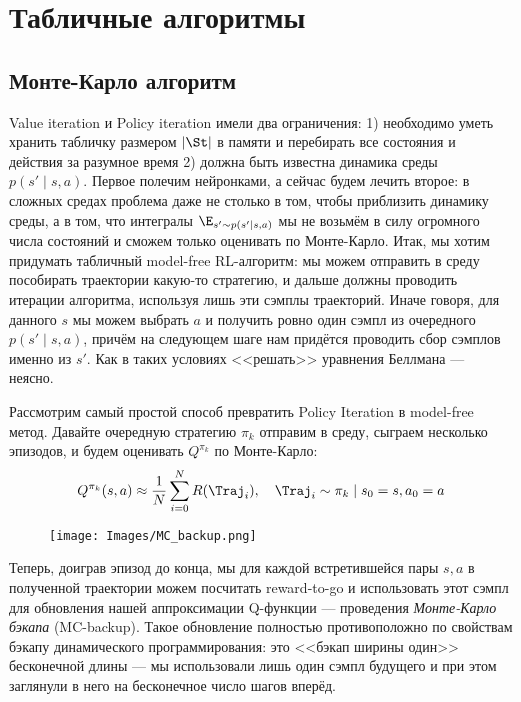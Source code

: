 \section{Табличные алгоритмы}\label{sec:tabularrlsection}

\subsection{Монте-Карло алгоритм}

Value iteration и Policy iteration имели два ограничения: 1) необходимо уметь хранить табличку размером $| \St |$ в памяти и перебирать все состояния и действия за разумное время 2) должна быть известна динамика среды $p(s' \mid s, a)$. Первое полечим нейронками, а сейчас будем лечить второе: в сложных средах проблема даже не столько в том, чтобы приблизить динамику среды, а в том, что интегралы $\E_{s' \sim p(s' \mid s, a)}$ мы не возьмём в силу огромного числа состояний и сможем только оценивать по Монте-Карло. 
Итак, мы хотим придумать табличный model-free RL-алгоритм: мы можем отправить в среду пособирать траектории какую-то стратегию, и дальше должны проводить итерации алгоритма, используя лишь эти сэмплы траекторий. Иначе говоря, для данного $s$ мы можем выбрать $a$ и получить ровно один сэмпл из очередного $p(s' \mid s, a)$, причём на следующем шаге нам придётся проводить сбор сэмплов именно из $s'$. Как в таких условиях <<решать>> уравнения Беллмана --- неясно.

Рассмотрим самый простой способ превратить Policy Iteration в model-free метод. Давайте очередную стратегию $\pi_k$ отправим в среду, сыграем несколько эпизодов, и будем оценивать $Q^{\pi_k}$ по Монте-Карло:
$$Q^{\pi_k}(s, a) \approx \frac{1}{N} \sum_{i=0}^N R(\Traj_i), \quad \Traj_i \sim \pi_k \mid s_0 = s, a_0 = a$$

\begin{wrapfigure}{r}{0.35\textwidth}
\vspace{-0.3cm}
\centering
\texttt{[image: Images/MC\_backup.png]}
\vspace{-0.3cm}
\end{wrapfigure}
Теперь, доиграв эпизод до конца, мы для каждой встретившейся пары $s, a$ в полученной траектории можем посчитать reward-to-go и использовать этот сэмпл для обновления нашей аппроксимации Q-функции --- проведения \emph{Монте-Карло бэкапа} (MC-backup). Такое обновление полностью противоположно по свойствам бэкапу динамического программирования: это <<бэкап ширины один>> бесконечной длины --- мы использовали лишь один сэмпл будущего и при этом заглянули в него на бесконечное число шагов вперёд.

